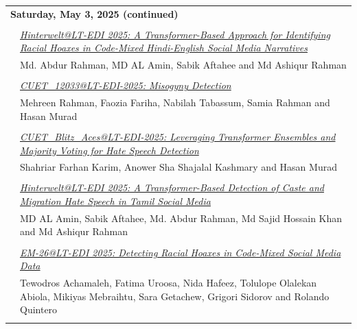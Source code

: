 \documentclass[11pt,oneside]{book}
\begin{document}
    \newpage
          \begin{tabular}{p{24mm}p{124mm}}
    \multicolumn{2}{l}{\bf Saturday, May 3, 2025 (continued)} \\\\
          
                      & \hyperlink{page.121}{\emph{Hinterwelt@LT-EDI 2025: A Transformer-Based Approach for Identifying Racial Hoaxes in Code-Mixed Hindi-English Social Media Narratives}}\\
        & Md. Abdur Rahman\index{Rahman}, MD AL Amin\index{Amin}, Sabik Aftahee\index{Aftahee} and Md Ashiqur Rahman\index{Rahman}\\\\
                
                      & \hyperlink{page.127}{\emph{CUET\_12033@LT-EDI-2025: Misogyny Detection}}\\
        & Mehreen Rahman\index{Rahman}, Faozia Fariha\index{Fariha}, Nabilah Tabassum\index{Tabassum}, Samia Rahman\index{Rahman} and Hasan Murad\index{Murad}\\\\
                
                      & \hyperlink{page.133}{\emph{CUET\_Blitz\_Aces@LT-EDI-2025: Leveraging Transformer Ensembles and Majority Voting for Hate Speech Detection}}\\
        & Shahriar Farhan Karim\index{Karim}, Anower Sha Shajalal Kashmary\index{Kashmary} and Hasan Murad\index{Murad}\\\\
                
                      & \hyperlink{page.140}{\emph{Hinterwelt@LT-EDI 2025: A Transformer-Based Detection of Caste and Migration Hate Speech in Tamil Social Media}}\\
        & MD AL Amin\index{Amin}, Sabik Aftahee\index{Aftahee}, Md. Abdur Rahman\index{Rahman}, Md Sajid Hossain Khan\index{Khan} and Md Ashiqur Rahman\index{Rahman}\\\\
                
                      & \hyperlink{page.146}{\emph{EM-26@LT-EDI 2025: Detecting Racial Hoaxes in Code-Mixed Social Media Data}}\\
        & Tewodros Achamaleh\index{Achamaleh}, Fatima Uroosa\index{Uroosa}, Nida Hafeez\index{Hafeez}, Tolulope Olalekan Abiola\index{Abiola}, Mikiyas Mebraihtu\index{Mebraihtu}, Sara Getachew\index{Getachew}, Grigori Sidorov\index{Sidorov} and Rolando Quintero\index{Quintero}\\\\
                

\end{tabular}
\end{document}
